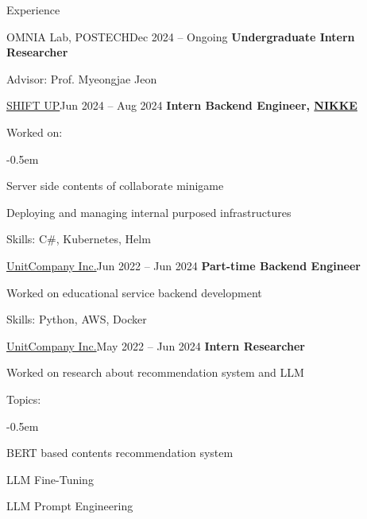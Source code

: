 \documentclass{resume}
\begin{document}
\begin{rSection}{Experience}
    \begin{rSubsection}{OMNIA Lab, POSTECH}{Dec 2024 -- Ongoing}
        \textbf{Undergraduate Intern Researcher}

        \item Advisor: Prof. Myeongjae Jeon
    \end{rSubsection}

    \begin{rSubsection}{\href{https://shiftup.co.kr/}{SHIFT UP}}{Jun 2024 -- Aug 2024}
        \textbf{Intern Backend Engineer, \href{https://nikke-en.com/}{NIKKE}}

        \item Worked on:

        \vspace{-0.5em}
        \begin{list}{--}{}
            \itemsep -0.5em

            \item Server side contents of collaborate minigame

            \item Deploying and managing internal purposed infrastructures
        \end{list}

        \item Skills: C\#, Kubernetes, Helm
    \end{rSubsection}

    \begin{rSubsection}{\href{https://unitcompany.co.kr}{UnitCompany Inc.}}{Jun 2022 -- Jun 2024}
        \textbf{Part-time Backend Engineer}

        \item Worked on educational service backend development

        \item Skills: Python, AWS, Docker
    \end{rSubsection}

    \begin{rSubsection}{\href{https://unitcompany.co.kr}{UnitCompany Inc.}}{May 2022 -- Jun 2024}
        \textbf{Intern Researcher}

        \item Worked on research about recommendation system and LLM

        \item Topics:

        \vspace{-0.5em}
        \begin{list}{--}{}
            \itemsep -0.5em

            \item BERT based contents recommendation system

            \item LLM Fine-Tuning

            \item LLM Prompt Engineering
        \end{list}
    \end{rSubsection}
\end{rSection}
\end{document}
